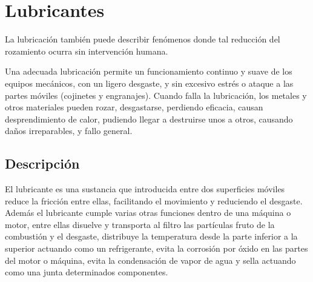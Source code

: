 \section{Lubricantes}




La lubricación también puede describir fenómenos donde tal reducción del rozamiento ocurra sin intervención humana.

Una adecuada lubricación permite un funcionamiento continuo y suave de los equipos mecánicos, con un ligero desgaste, y sin excesivo estrés o ataque a las partes móviles (cojinetes y engranajes). Cuando falla la lubricación, los metales y otros materiales pueden rozar, desgastarse, perdiendo eficacia, causan desprendimiento de calor, pudiendo llegar a destruirse unos a otros, causando daños irreparables, y fallo general.



\subsection{Descripción}


El lubricante es una sustancia que introducida entre dos superficies móviles reduce la fricción entre ellas, facilitando el movimiento y reduciendo el desgaste. Además el lubricante cumple varias otras funciones dentro de una máquina o motor, entre ellas disuelve y transporta al filtro las partículas fruto de la combustión y el desgaste, distribuye la temperatura desde la parte inferior a la superior actuando como un refrigerante, evita la corrosión por óxido en las partes del motor o máquina, evita la condensación de vapor de agua y sella actuando como una junta determinados componentes. 




